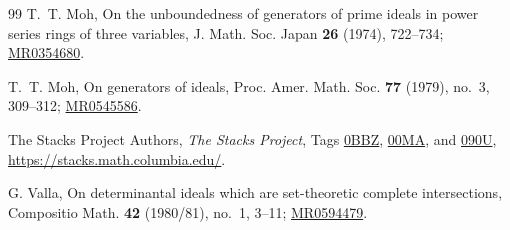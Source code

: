 \documentclass[11pt]{amsart}
\theoremstyle{remark}
\begin{document}
\begin{thebibliography}{99}
T.~T. Moh, On the unboundedness of generators of prime ideals in power series rings of three variables, J. Math. Soc. Japan {\bf 26} (1974), 722--734; \href{https://mathscinet.ams.org/mathscinet/article?mr=354680}{MR0354680}.

T.~T. Moh, On generators of ideals, Proc. Amer. Math. Soc. {\bf 77} (1979), no.~3, 309--312; \href{https://mathscinet.ams.org/mathscinet/article?mr=545586}{MR0545586}.

The Stacks Project Authors,
\emph{The Stacks Project},
Tags \href{https://stacks.math.columbia.edu/tag/0BBZ}{0BBZ},
\href{https://stacks.math.columbia.edu/tag/00MA}{00MA},
and \href{https://stacks.math.columbia.edu/tag/090U}{090U},
\url{https://stacks.math.columbia.edu/}.

G. Valla, On determinantal ideals which are set-theoretic complete intersections, Compositio Math. {\bf 42} (1980/81), no.~1, 3--11; \href{https://mathscinet.ams.org/mathscinet/article?mr=594479}{MR0594479}.

\end{thebibliography}
\end{document}
